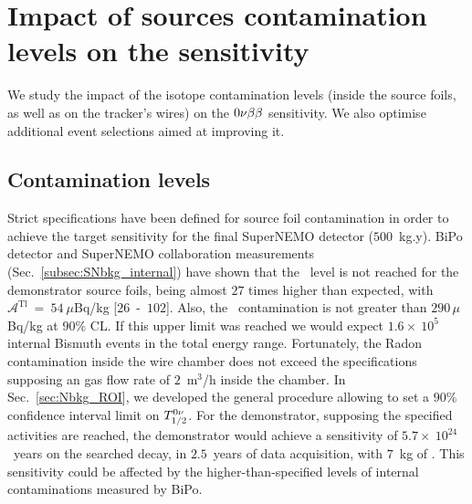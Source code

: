 \section{Impact of sources contamination levels on the sensitivity}
\label{sec:demonstrator_sensitivity}

We study the impact of the isotope contamination levels (inside the source foils, as well as on the tracker's wires) on the $0\nu\beta\beta$ sensitivity.
We also optimise additional event selections aimed at improving it.


\subsection{Contamination levels}
\label{subsec:Influence_cont}

Strict specifications have been defined for source foil contamination in order to achieve the target sensitivity for the final SuperNEMO detector ($500$~kg.y).
BiPo detector and SuperNEMO collaboration measurements (Sec.~\ref{subsec:SNbkg_internal}) have shown that the \Tl\ level is not reached for the demonstrator source foils, being almost $27$ times higher than expected, with $\mathcal{A}^{\text{Tl}}~=~54~\mu$Bq/kg [$26$~-~$102$].
Also, the \Bi\ contamination is not greater than $290\,\mu$Bq/kg at $90$\% CL.
If this upper limit was reached we would expect $1.6\times~10^{5}$ internal Bismuth events in the total energy range.
Fortunately, the Radon contamination inside the wire chamber does not exceed the specifications supposing an gas flow  rate of $2$~m$^{3}$/h inside the chamber.
In Sec.~\ref{sec:Nbkg_ROI}, we developed the general procedure allowing to set a $90\%$ confidence interval limit on $T_{1/2}^{0\nu}$.
For the demonstrator, supposing the specified activities are reached, the demonstrator would achieve a sensitivity of $5.7\times~10^{24}$~years on the searched decay, in $2.5$~years of data acquisition, with $7$~kg of \Se.
This sensitivity could be affected by the higher-than-specified levels of internal contaminations measured by BiPo.

